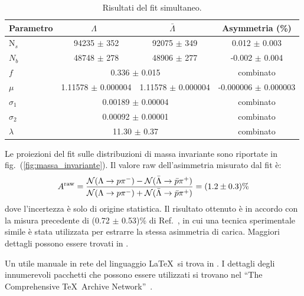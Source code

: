 \documentclass[a4paper,10pt]{article}
\newcommand{\latex}{\LaTeX}
\newcommand{\proton}{\ensuremath{p}}
\newcommand{\antiproton}{\ensuremath{\bar{p}}}
\newcommand{\lambdazero}{\ensuremath{\Lambda}}
\newcommand{\alambdazero}{\ensuremath{\bar{\Lambda}}}
\newcommand{\lambdazeroppi}{\ensuremath{\lambdazero \to \proton\pi^-}}
\newcommand{\alambdazeroppi}{\ensuremath{\bar{\lambdazero} \to \antiproton \pi^+}}
\begin{document}
\begin{table}[!ht]
\centering
\begin{tabular}{lccc}
\hline\hline
Parametro			&	\lambdazero\        				&	\alambdazero\			& Asymmetria (\%)		 \\
\hline				                                                	
N$_{s}$	                 	&	94235 $\pm$ 352 			        &	92075  $\pm$ 349           	& 0.012 $\pm$  0.003	\\
$N_{b}$		         	& 	48748 $\pm$ 278				& 	48906 $\pm$ 277	                & -0.002 $\pm$ 0.004  \\
$f$					& 	\multicolumn{2}{c}{0.336 $\pm$ 0.015}		&   combinato \\
$\mu$				& 	1.11578 $\pm$ 0.000004		& 1.11578 $\pm$ 0.000004	       & -0.000006 $\pm$ 0.000003 \\
$\sigma_{1}$			& 	\multicolumn{2}{c}{0.00189 $\pm$ 0.00004}	 	& combinato\\
$\sigma_{2}$			& 	\multicolumn{2}{c}{0.00092 $\pm$ 0.00001}		& combinato\\
$\lambda$	         	& 	\multicolumn{2}{c}{11.30 $\pm$ 0.37}			 	& combinato\\
\hline\hline
\end{tabular}
\caption[Results of the fit]{Risultati del fit simultaneo.}
\label{tab:fit}
\end{table} 
Le proiezioni del fit sulle distribuzioni di  massa invariante sono riportate in fig.~(\ref{fig:massa_invariante}).
Il valore raw dell'asimmetria misurato dal fit \`e:
\begin{equation}
A^{\rm raw}=\frac{\mathcal{N}(\lambdazeroppi) - \mathcal{N}(\alambdazeroppi)}{\mathcal{N}(\lambdazeroppi) + \mathcal{N}(\alambdazeroppi)} =  (1.2 \pm  0.3)\%     %
\label{eq:asym_raw_result}
\end{equation}
dove l'incertezza \`e solo di origine statistica.  Il risultato ottenuto \`e in accordo con 
la misura precedente di (0.72 $\pm$ 0.53)\% di Ref.~\cite{prl_acp}, in cui una tecnica sperimentale simile
\`e stata utilizzata per estrarre la stessa asimmetria di carica.   Maggiori dettagli possono essere trovati 
in \cite{Aad:2012tfa,Chatrchyan:2012ufa}. 

Un utile manuale in rete del linguaggio \latex\ si trova in \cite{manuale_latex}. I dettagli degli innumerevoli pacchetti
che possono essere utilizzati si trovano nel ``The Comprehensive \TeX\ Archive Network''~\cite{ctan}.




\end{document}
